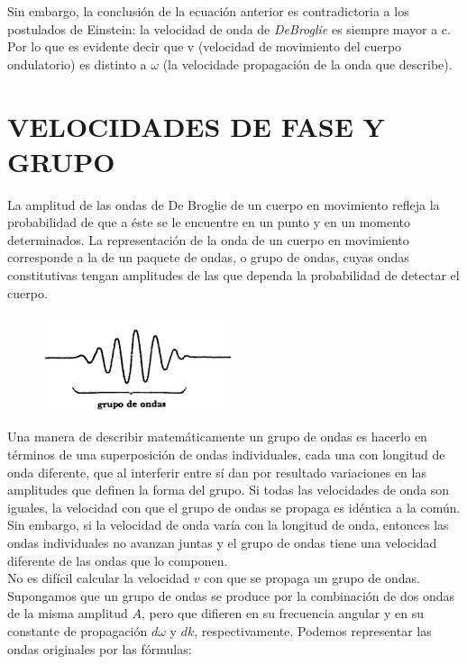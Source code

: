 \documentclass[a4paper]{article}
\begin{document}
    \indent Sin embargo, la conclusión de la ecuación anterior es contradictoria a los postulados de Einstein: la velocidad de onda de \textit{DeBroglie} es siempre mayor a c. Por lo que es evidente decir que v (velocidad de movimiento del cuerpo ondulatorio) es distinto a $\omega$ (la velocidade propagación de la onda que describe). \\

\newpage
\noindent
\thispagestyle{fancy}

\section{VELOCIDADES DE FASE Y GRUPO}
    \indent La amplitud de las ondas de De Broglie de un cuerpo en movimiento refleja la probabilidad de que a éste se le encuentre en un punto y en un momento determinados. La representación de la onda de un cuerpo en movimiento corresponde a la de un paquete de ondas, o grupo de ondas, cuyas ondas constitutivas tengan amplitudes de las que dependa la probabilidad de detectar el cuerpo.\\

    \begin{figure}[h!]
        \centering
        \includegraphics[width = 5.5cm]{../grupoDeOndas.png}
    \end{figure}

    \indent Una manera de describir matemáticamente un grupo de ondas es hacerlo en términos de una superposición de ondas individuales, cada una con longitud de onda diferente, que al interferir entre sí dan por resultado variaciones en las amplitudes que definen la forma del grupo. Si todas las velocidades de onda son iguales, la velocidad con que el grupo de ondas se propaga es idéntica a la común. Sin embargo, si la velocidad de onda varía con la longitud de onda, entonces las ondas individuales no avanzan juntas y el grupo de ondas tiene una velocidad diferente de las ondas que lo componen.\\

    \indent No es difícil calcular la velocidad $v$ con que se propaga un grupo de ondas. Supongamos que un grupo de ondas se produce por la combinación de dos ondas de la misma amplitud $A$, pero que difieren en su frecuencia angular y en su constante de propagación $d\omega$  y $dk$, respectivamente. Podemos representar las ondas originales por las fórmulas:\\
\end{document}
